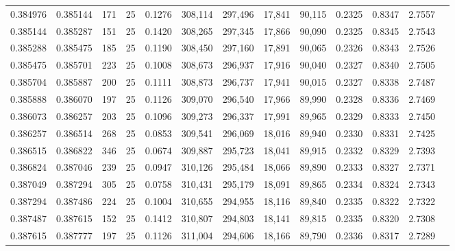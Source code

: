\begin{tabular}{rrrrrrrrrrrrr}
0.384976 & 0.385144 &   171 &  25 &                                     0.1276 & 308,114 & 297,496 &  17,841 &  90,115 & 0.2325 & 0.8347 & 2.7557 \\
0.385144 & 0.385287 &   151 &  25 &                                     0.1420 & 308,265 & 297,345 &  17,866 &  90,090 & 0.2325 & 0.8345 & 2.7543 \\
0.385288 & 0.385475 &   185 &  25 &                                     0.1190 & 308,450 & 297,160 &  17,891 &  90,065 & 0.2326 & 0.8343 & 2.7526 \\
0.385475 & 0.385701 &   223 &  25 &                                     0.1008 & 308,673 & 296,937 &  17,916 &  90,040 & 0.2327 & 0.8340 & 2.7505 \\
0.385704 & 0.385887 &   200 &  25 &                                     0.1111 & 308,873 & 296,737 &  17,941 &  90,015 & 0.2327 & 0.8338 & 2.7487 \\
0.385888 & 0.386070 &   197 &  25 &                                     0.1126 & 309,070 & 296,540 &  17,966 &  89,990 & 0.2328 & 0.8336 & 2.7469 \\
0.386073 & 0.386257 &   203 &  25 &                                     0.1096 & 309,273 & 296,337 &  17,991 &  89,965 & 0.2329 & 0.8333 & 2.7450 \\
0.386257 & 0.386514 &   268 &  25 &                                     0.0853 & 309,541 & 296,069 &  18,016 &  89,940 & 0.2330 & 0.8331 & 2.7425 \\
0.386515 & 0.386822 &   346 &  25 &                                     0.0674 & 309,887 & 295,723 &  18,041 &  89,915 & 0.2332 & 0.8329 & 2.7393 \\
0.386824 & 0.387046 &   239 &  25 &                                     0.0947 & 310,126 & 295,484 &  18,066 &  89,890 & 0.2333 & 0.8327 & 2.7371 \\
0.387049 & 0.387294 &   305 &  25 &                                     0.0758 & 310,431 & 295,179 &  18,091 &  89,865 & 0.2334 & 0.8324 & 2.7343 \\
0.387294 & 0.387486 &   224 &  25 &                                     0.1004 & 310,655 & 294,955 &  18,116 &  89,840 & 0.2335 & 0.8322 & 2.7322 \\
0.387487 & 0.387615 &   152 &  25 &                                     0.1412 & 310,807 & 294,803 &  18,141 &  89,815 & 0.2335 & 0.8320 & 2.7308 \\
0.387615 & 0.387777 &   197 &  25 &                                     0.1126 & 311,004 & 294,606 &  18,166 &  89,790 & 0.2336 & 0.8317 & 2.7289 \\

\end{tabular}
